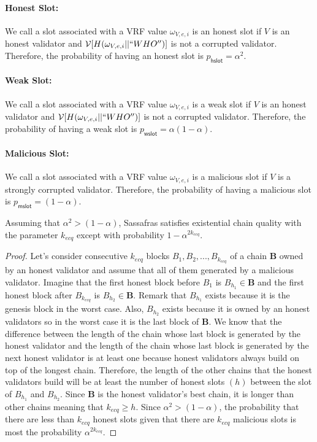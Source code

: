 \paragraph{Honest Slot:} We call a slot associated with a VRF value $ \omega_{V,e,i} $ is an honest slot  if $ V $ is an honest validator and $ \mathcal{V}[H(\omega_{V,e,i}||``WHO'')] $ is not a corrupted validator. Therefore, the probability of having an honest slot is $ p_{\mathsf{hslot}} = \alpha^2 $.  

\paragraph{Weak Slot:} We call a slot associated with a VRF value $ \omega_{V,e,i} $ is a weak slot  if $ V $ is an honest validator and $ \mathcal{V}[H(\omega_{V,e,i}||``WHO'')] $ is not a corrupted validator. Therefore, the probability of having a weak slot is $ p_{\mathsf{wslot}} = \alpha (1-\alpha) $.  

\paragraph{Malicious Slot:}  We call a slot associated with a VRF value $ \omega_{V,e,i} $ is a malicious slot  if $ V $ is a strongly corrupted validator. Therefore, the probability of having a malicious slot is $ p_{\mathsf{mslot}} =  (1-\alpha) $.  



\begin{lemma}[ECQ]
	Assuming that $ \alpha^2 > (1-\alpha) $, Sassafras satisfies existential chain quality with the parameter $ k_{ecq} $ except with probability $ 1- \alpha^{2k_{ecq}} $.
\end{lemma}

\begin{proof}

 Let's consider consecutive $ k_{ecq} $ blocks $ B_1, B_2, ..., B_{k_{ecq}} $ of a chain $ \mathbf{B} $ owned by an honest validator  and assume that all of them generated by a malicious validator. Imagine that the first honest block before $ B_1 $ is $ B_{h_1}  \in \mathbf{B}$  and the first honest block after $ B_{k_{ecq}} $ is $ B_{h_2}  \in \mathbf{B}$. Remark that $ B_{h_1} $ exists because it is the genesis block in the worst case. Also, $ B_{h_2} $ exists because it is owned by an honest validators so in the worst case it is the last block of $ \mathbf{B} $. We know that the difference between the length of the chain whose last block is generated by the honest validator and the length of the chain whose last block is generated by the next honest validator is at least one because honest validators always build on top of the longest chain. Therefore, the length of the other chains that the honest validators build will be at least the number of honest slots $ (h) $ between the slot of $ B_{h_1} $ and $ B_{h_2} $. Since $ \mathbf{B} $ is the honest validator's best chain, it is longer than other chains meaning that $ k_{ecq} \geq h $.  Since $ \alpha^2 > (1-\alpha)  $, the probability that there are less than $ k_{ecq} $ honest slots given that there are $ k_{ecq} $ malicious slots is  most the probability $ \alpha^{2k_{ecq}} $.
 \end{proof}

